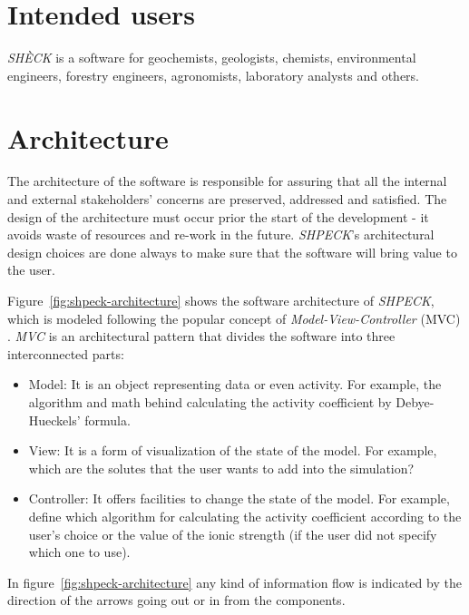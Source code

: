 \section{Intended users}
\emph{SHÈCK} is a software for geochemists, geologists, chemists, environmental engineers, forestry engineers, agronomists, laboratory analysts and others. 

\section{Architecture}
The architecture of the software is responsible for assuring that all the internal and external stakeholders' concerns are preserved, addressed and satisfied. The design of the architecture must occur prior the start of the development - it avoids waste of resources and re-work in the future. \emph{SHPECK}'s architectural design choices are done always to make sure that the software will bring value to the user. 


Figure~\ref{fig:shpeck-architecture} shows the software architecture of \emph{SHPECK}, which is modeled following the popular concept of \emph{Model-View-Controller} (MVC) \cite{Gamma:94}. \emph{MVC} is an architectural pattern that divides the software into three interconnected parts:
\begin{itemize}
\item Model: It is an object representing data or even activity. For example, the algorithm and math behind calculating the activity coefficient by Debye-Hueckels' formula.
\item View: It is a form of visualization of the state of the model. For example, which are the solutes that the user wants to add into the simulation?
\item Controller: It offers facilities to change the state of the model. For example, define which algorithm for calculating the activity coefficient according to the user's choice or the value of the ionic strength (if the user did not specify which one to use).
\end{itemize}
In figure~\ref{fig:shpeck-architecture} any kind of information flow is indicated by the direction of the arrows going out or in from the components.

